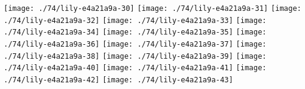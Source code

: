 \else
  \expandafter{}%
\fi
\texttt{[image: ./74/lily-e4a21a9a-30]}%
\ifx\betweenLilyPondSystem \undefined
  \linebreak
\else
  \expandafter{}%
\fi
\texttt{[image: ./74/lily-e4a21a9a-31]}%
\ifx\betweenLilyPondSystem \undefined
  \linebreak
\else
  \expandafter{}%
\fi
\texttt{[image: ./74/lily-e4a21a9a-32]}%
\ifx\betweenLilyPondSystem \undefined
  \linebreak
\else
  \expandafter{}%
\fi
\texttt{[image: ./74/lily-e4a21a9a-33]}%
\ifx\betweenLilyPondSystem \undefined
  \linebreak
\else
  \expandafter{}%
\fi
\texttt{[image: ./74/lily-e4a21a9a-34]}%
\ifx\betweenLilyPondSystem \undefined
  \linebreak
\else
  \expandafter{}%
\fi
\texttt{[image: ./74/lily-e4a21a9a-35]}%
\ifx\betweenLilyPondSystem \undefined
  \linebreak
\else
  \expandafter{}%
\fi
\texttt{[image: ./74/lily-e4a21a9a-36]}%
\ifx\betweenLilyPondSystem \undefined
  \linebreak
\else
  \expandafter{}%
\fi
\texttt{[image: ./74/lily-e4a21a9a-37]}%
\ifx\betweenLilyPondSystem \undefined
  \linebreak
\else
  \expandafter{}%
\fi
\texttt{[image: ./74/lily-e4a21a9a-38]}%
\ifx\betweenLilyPondSystem \undefined
  \linebreak
\else
  \expandafter{}%
\fi
\texttt{[image: ./74/lily-e4a21a9a-39]}%
\ifx\betweenLilyPondSystem \undefined
  \linebreak
\else
  \expandafter{}%
\fi
\texttt{[image: ./74/lily-e4a21a9a-40]}%
\ifx\betweenLilyPondSystem \undefined
  \linebreak
\else
  \expandafter{}%
\fi
\texttt{[image: ./74/lily-e4a21a9a-41]}%
\ifx\betweenLilyPondSystem \undefined
  \linebreak
\else
  \expandafter{}%
\fi
\texttt{[image: ./74/lily-e4a21a9a-42]}%
\ifx\betweenLilyPondSystem \undefined
  \linebreak
\else
  \expandafter{}%
\fi
\texttt{[image: ./74/lily-e4a21a9a-43]}%
\ifx\betweenLilyPondSystem \undefined
  \linebreak
\else
  \expandafter{}%
